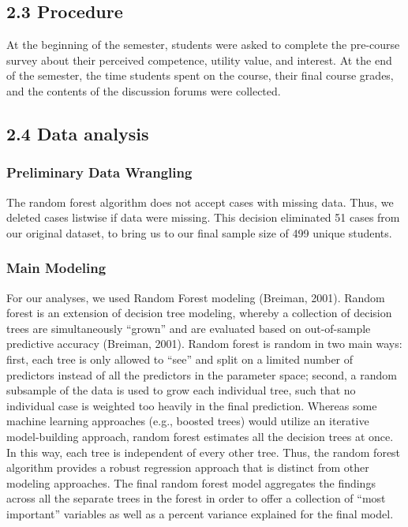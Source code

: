 \documentclass[acmart]{apa6}
\theoremstyle{definition}
\theoremstyle{definition}
\theoremstyle{definition}
\theoremstyle{remark}
\begin{document}
\subsection{2.3 Procedure}\label{procedure}

At the beginning of the semester, students were asked to complete the
pre-course survey about their perceived competence, utility value, and
interest. At the end of the semester, the time students spent on the
course, their final course grades, and the contents of the discussion
forums were collected.

\subsection{2.4 Data analysis}\label{data-analysis}

\subsubsection{Preliminary Data
Wrangling}\label{preliminary-data-wrangling}

The random forest algorithm does not accept cases with missing data.
Thus, we deleted cases listwise if data were missing. This decision
eliminated 51 cases from our original dataset, to bring us to our final
sample size of 499 unique students.

\subsubsection{Main Modeling}\label{main-modeling}

For our analyses, we used Random Forest modeling (Breiman, 2001). Random
forest is an extension of decision tree modeling, whereby a collection
of decision trees are simultaneously \enquote{grown} and are evaluated
based on out-of-sample predictive accuracy (Breiman, 2001). Random
forest is random in two main ways: first, each tree is only allowed to
\enquote{see} and split on a limited number of predictors instead of all
the predictors in the parameter space; second, a random subsample of the
data is used to grow each individual tree, such that no individual case
is weighted too heavily in the final prediction. Whereas some machine
learning approaches (e.g., boosted trees) would utilize an iterative
model-building approach, random forest estimates all the decision trees
at once. In this way, each tree is independent of every other tree.
Thus, the random forest algorithm provides a robust regression approach
that is distinct from other modeling approaches. The final random forest
model aggregates the findings across all the separate trees in the
forest in order to offer a collection of \enquote{most important}
variables as well as a percent variance explained for the final model.
\end{document}
